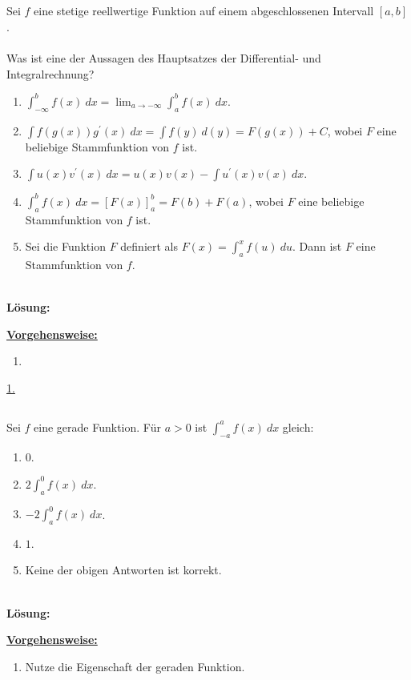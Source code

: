 \subsection*{}
Sei $f$ eine stetige reellwertige Funktion auf einem abgeschlossenen Intervall $[a,b]$.\\
\\
Was ist eine der Aussagen des Hauptsatzes der Differential- und Integralrechnung?
\renewcommand{\labelenumi}{(\alph{enumi})}
\begin{enumerate}
	\item 
	$\int_{-\infty}^b f(x) \ dx = 
	\lim_{a \to -\infty} \int_{a}^b f(x) \ dx
	$.
	\item 
	$\int f(g(x)) g^\prime(x) \ dx
	= \int f(y) \ d(y)
	= F(g(x) ) + C
	$, wobei $F$ eine beliebige Stammfunktion von $f$ ist.
	\item 
	$\int u(x) v^\prime(x) \ dx = u(x) v(x)  - \int u^\prime(x) v(x) \ dx$.
	\item 
	$\int_a^b f(x) \ dx
	=\left[F(x)\right]_a^b= F(b) +F(a)
	$, wobei $F$ eine beliebige Stammfunktion von $f$ ist.
	\item 
	Sei die Funktion $F$ definiert als $F(x) = \int_a^x f(u) \ du$.
	Dann ist $F$ eine Stammfunktion von $f$.
\end{enumerate}
\ \\
\textbf{Lösung:}
\begin{mdframed}
\underline{\textbf{Vorgehensweise:}}
\renewcommand{\labelenumi}{\theenumi.}
\begin{enumerate}
\item 
\end{enumerate}
\end{mdframed}

\underline{1. }\\


\newpage

\subsection*{}
Sei $ f $ eine gerade Funktion.
Für $a > 0$ ist $\int_{-a}^a f(x) \ dx$ gleich:
\renewcommand{\labelenumi}{(\alph{enumi})}
\begin{enumerate}
	\item 
	$ 0 $.
	\item
	$ 2 \int_a^0 f(x) \ dx $.
	\item
	$ -2  \int_a^0 f(x) \ dx$.
	\item
	$ 1 $.
	\item
	Keine der obigen Antworten ist korrekt.
\end{enumerate}
\ \\
\textbf{Lösung:}
\begin{mdframed}
\underline{\textbf{Vorgehensweise:}}
\renewcommand{\labelenumi}{\theenumi.}
\begin{enumerate}
\item Nutze die Eigenschaft der geraden Funktion.
\end{enumerate}
\end{mdframed}

